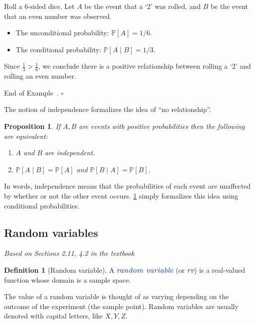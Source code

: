\documentclass[10pt]{article}
\newtheorem{proposition}[theorem]{Proposition}
\theoremstyle{definition}
\newtheorem{definition}[theorem]{Definition}
\newtheorem{example}[theorem]{Example}
\renewenvironment{example}
{\begin{oldexample}}
  {\par\smallskip\hfill   End of Example~\theexample. $\square$    \par\end{oldexample}}
\newcommand{\1}[1]{\textbf{1}_{\left[#1\right]}} %
\def\P{\mathbb{P}} %
\newcommand{\demph}[1]{\textcolor{RoyalBlue}{\textbf{\slshape #1}}} %
\begin{document}
\begin{example}
  Roll a 6-sided dice. Let $A$ be the event that a `2' was rolled, and $B$ be
  the event that an even number was observed.

  \begin{itemize}
    \item The unconditional probability: $\P\left[A \right]=1/6$.
    \item The conditional probability: $\P\left[A\mid B \right] = 1/3$.
  \end{itemize}
  Since $\frac{1}{3}>\frac{1}{6}$, we conclude there is a positive
  relationship between rolling a `2' and rolling an even number.
\end{example}

The notion of independence formalizes the idea of ``no relationship''.

\begin{proposition}
  \label{prop:independence-interpretation}
  If $A,B$ are events with positive probabilities then the following are
  equivalent:
  \begin{enumerate}[label=\rm{(\roman*.)}]
    \item $A$ and $B$ are independent.
    \item $\P\left[A\mid B \right] = \P\left[A \right]$
    and $\P\left[B\mid A \right] = \P\left[B \right]$.
  \end{enumerate}
\end{proposition}
In words, independence means that the probabilities of each event are
unaffected by whether or not the other event occurs.
\cref{prop:independence-interpretation} simply formalizes this idea using
conditional probabilities.


\subsection{Random variables}
\textit{Based on Sections 2.11, 4.2 in the textbook}


\begin{definition}[Random variable]
  A \demph{random variable} (or \demph{rv}) is a real-valued function whose domain is a sample
  space.
\end{definition}

The value of a random variable is thought of as varying depending on the
outcome of the experiment (the sample point). Random variables are usually
denoted with capital letters, like $X,Y,Z$.
\end{document}
